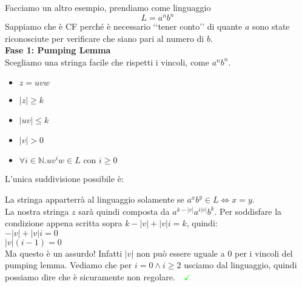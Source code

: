 \documentclass[a4paper,oneside]{scrbook}
\newcommand{\greenmark}{\quad \textcolor{green}{\checkmark}}
\begin{document}
Facciamo un altro esempio, prendiamo come linguaggio
$$L={a^nb^n}$$
Sappiamo che è CF perché è necessario ‘‘tener conto’’ di quante $a$ sono state riconosciute per verificare che siano pari al numero di $b$.\\
\textbf{Fase 1: Pumping Lemma}\\
Scegliamo una stringa facile che rispetti i vincoli, come $a^nb^n$.
\begin{itemize}
	\item $z=uvw$
	\item $|z|\geq k$
	\item $|uv|\leq k$
	\item $|v|>0$
	\item $\forall i \in \mathbb{N}.uv^iw\in L \text{ con }i\geq0$
\end{itemize}
L'unica suddivisione possibile è:
\begin{center}
\end{center}
La stringa apparterrà al linguaggio solamente se $a^xb^y\in L \Leftrightarrow x=y$.\\
La nostra stringa $z$ sarà quindi composta da $a^{k-|v|}a^{i|v|}b^k$. Per soddisfare la condizione appena scritta sopra $k-|v|+|v|i=k$, quindi:\\
$-|v|+|v|i=0$\\
$|v|(i-1)=0$\\
Ma questo è un assurdo! Infatti $|v|$ non può essere uguale a $0$ per i vincoli del pumping lemma.
Vediamo che per $i=0 \wedge i\geq2$ usciamo dal linguaggio, quindi possiamo dire che è sicuramente non regolare.$\greenmark$\\
\end{document}
